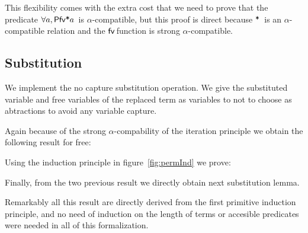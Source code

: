 \documentclass{article}
\newcommand{\alp}{\ensuremath{\alpha}}
\newcommand{\fv}{\ensuremath{{\AgdaFunction{fv}}\,}}
\newcommand{\free}{\ensuremath{\mathbin{\AgdaFunction{*}}}}
\begin{document}
This flexibility comes with the extra cost that we need to prove that the predicate $\forall a , \AgdaFunction{Pfv*} a$\ is \alp-compatible, but this proof is direct because \free\ is an \alp-compatible relation and the \fv function is strong \alp-compatible.

\subsection{Substitution}
\label{subst}

We implement the no capture substitution operation. We give the substituted variable and free variables of the replaced term as variables to not to choose as abtractions to avoid any variable capture.


 \hspace{5px}

Again because of the strong \alp-compability of the iteration principle we obtain the following result for free:

 \hspace{5px}

Using the induction principle in figure~\ref{fig:permInd} we prove:

 \hspace{5px}

Finally, from the two previous result we directly obtain next substitution lemma.

 \hspace{5px}

Remarkably all this result are directly derived from the first primitive induction principle, and no need of induction on the length of terms or accesible predicates were needed in all of this formalization.

\end{document}
